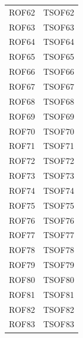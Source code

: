 \documentclass[../PianoDiQualifica_v4.0.0.tex]{subfiles}
\begin{document}
\begin{longtable}[c] { >{\centering\arraybackslash}p{3cm} >{\centering\arraybackslash}p{3cm}}
			ROF62 & TSOF62 \\
			\addlinespace[0.3em]
			\midrule
			\addlinespace[0.3em]
			ROF63 & TSOF63 \\
			\addlinespace[0.3em]
			\midrule
			\addlinespace[0.3em]
			ROF64 & TSOF64 \\
			\addlinespace[0.3em]
			\midrule
			\addlinespace[0.3em]
			ROF65 & TSOF65 \\
			\addlinespace[0.3em]
			\midrule
			\addlinespace[0.3em]
			ROF66 & TSOF66 \\
			\addlinespace[0.3em]
			\midrule
			\addlinespace[0.3em]
			ROF67 & TSOF67 \\
			\addlinespace[0.3em]
			\midrule
			\addlinespace[0.3em]
			ROF68 & TSOF68 \\
			\addlinespace[0.3em]
			\midrule
			\addlinespace[0.3em]
			ROF69 & TSOF69 \\
			\addlinespace[0.3em]
			\midrule
			\addlinespace[0.3em]
			ROF70 & TSOF70 \\
			\addlinespace[0.3em]
			\midrule
			\addlinespace[0.3em]
			ROF71 & TSOF71 \\
			\addlinespace[0.3em]
			\midrule
			\addlinespace[0.3em]
			ROF72 & TSOF72 \\
			\addlinespace[0.3em]
			\midrule
			\addlinespace[0.3em]
			ROF73 & TSOF73 \\
			\addlinespace[0.3em]
			\midrule
			\addlinespace[0.3em]
			ROF74 & TSOF74 \\
			\addlinespace[0.3em]
			\midrule
			\addlinespace[0.3em]
			ROF75 & TSOF75 \\
			\addlinespace[0.3em]
			\midrule
			\addlinespace[0.3em]
			ROF76 & TSOF76 \\
			\addlinespace[0.3em]
			\midrule
			\addlinespace[0.3em]
			ROF77 & TSOF77 \\
			\addlinespace[0.3em]
			\midrule
			\addlinespace[0.3em]
			ROF78 & TSOF78 \\
			\addlinespace[0.3em]
			\midrule
			\addlinespace[0.3em]
			ROF79 & TSOF79 \\
			\addlinespace[0.3em]
			\midrule
			\addlinespace[0.3em]
			ROF80 & TSOF80 \\
			\addlinespace[0.3em]
			\midrule
			\addlinespace[0.3em]
			ROF81 & TSOF81 \\
			\addlinespace[0.3em]
			\midrule
			\addlinespace[0.3em]
			ROF82 & TSOF82 \\
			\addlinespace[0.3em]
			\midrule
			\addlinespace[0.3em]
			ROF83 & TSOF83 \\

\end{longtable}
\end{document}
